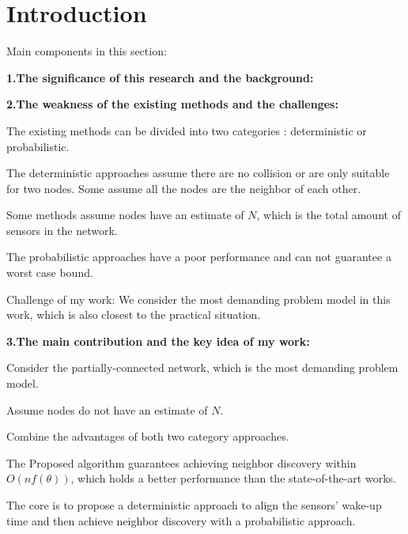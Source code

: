 \section{Introduction}

Main components in this section:

\textbf{1.The significance of this research and the background:}
\vspace{3mm}

\textbf{2.The weakness of the existing methods and the challenges:}

The existing methods can be divided into two categories :  deterministic or probabilistic.

The deterministic approaches assume there are no collision or are only suitable for two nodes.
Some assume all the nodes are the neighbor of each other.

Some methods assume nodes have an estimate of $N$, which is the total amount of sensors in the network.

The probabilistic approaches have a poor performance and can not guarantee a worst case bound. 


Challenge of my work:
We consider the most demanding problem model in this work, which is also closest to the practical situation.

\textbf{3.The main contribution and the key idea of my work:}

Consider the partially-connected network, which is the most demanding problem model.

Assume nodes do not have an estimate of $N$.

Combine the advantages of both two category approaches.

The Proposed algorithm guarantees achieving neighbor discovery within $O(nf(\theta))$, which holds a better
performance than the state-of-the-art works.

The core is to propose a deterministic approach to  align the sensors' wake-up time and then achieve neighbor discovery with a probabilistic approach.




